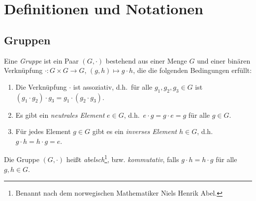 \chapter{Definitionen und Notationen}





\section{Gruppen}


\begin{defi}
 Eine \emph{Gruppe} ist ein Paar $(G,\cdot)$ bestehend aus einer Menge $G$ und einer binären Verknüpfung $\cdot \colon G \times G \to G$, $(g, h) \mapsto g \cdot h$, die die folgenden Bedingungen erfüllt:
 \begin{enumerate}[label=\roman*)]
  \item
   Die Verknüpfung $\cdot$ ist assoziativ, d.h.\ für alle $g_1, g_2, g_3 \in G$ ist $(g_1 \cdot g_2) \cdot g_3 = g_1 \cdot (g_2 \cdot g_3)$.
  \item
   Es gibt ein \emph{neutrales Element} $e \in G$, d.h.\ $e \cdot g = g \cdot e = g$ für alle $g \in G$.
  \item
   Für jedes Element $g \in G$ gibt es ein \emph{inverses Element} $h \in G$, d.h.\ $g \cdot h = h \cdot g = e$.
 \end{enumerate}
 Die Gruppe $(G, \cdot)$ heißt \emph{abelsch}\footnote{Benannt nach dem norwegischen Mathematiker Niels Henrik Abel.}, bzw. \emph{kommutativ}, falls $g \cdot h = h \cdot g$ für alle $g,h \in G$.
\end{defi}


